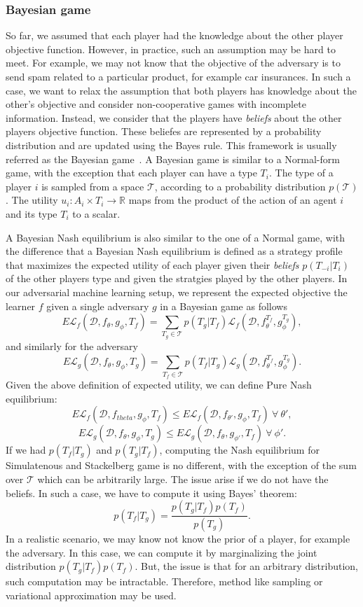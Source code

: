 \subsubsection{Bayesian game}
So far, we assumed that each player had the knowledge about the other player objective function.
However, in practice, such an assumption may be hard to meet.
For example, we may  not know that the objective of the adversary is to send spam related to a particular product, for example car insurances.
In such a case, we want to relax the assumption that both players has knowledge about the other's objective and consider non-cooperative games with incomplete information.
Instead, we consider that the players have \textit{beliefs} about the other players objective function. These beliefes are represented by a probability distribution and are updated using the Bayes rule.
This framework is usually referred as the Bayesian game~\cite{harsanyi_bayesian_games}. A Bayesian game is similar to a Normal-form game, with the exception that each player can have a type $T_i$.
The type of a player $i$ is sampled from a space $\mathcal{T}$, according to a probability distribution $p(\mathcal{T})$. The utility $u_i:A_i\times T_i\to\mathbb{R}$ maps from the product of the action of
an agent $i$ and its type $T_i$ to a scalar.

A Bayesian Nash equilibrium is also similar to the one of a Normal game, with the difference that a Bayesian Nash equilibrium is defined as a strategy profile that maximizes the expected utility of each player
given their \textit{beliefs} $p(T_{-i}|T_i)$ of the other players type and given the stratgies played by the other players. In our adversarial machine learning setup, we represent the expected objective the learner $f$
given a single adversary $g$ in a Bayesian game as follows
\[
     E\mathcal{L}_f(\mathcal{D}, f_\theta, g_\phi, T_f) = \sum_{T_g\in\mathcal{T}}p(T_g|T_f)\mathcal L_f(\mathcal{D}, f_{\theta}^{T_f}, g_{\phi}^{T_g}),
\]
and similarly for the adversary
\[
    E\mathcal{L}_g(\mathcal{D}, f_\theta, g_\phi, T_g) = \sum_{T_f\in\mathcal{T}}p(T_f|T_g)\mathcal L_g(\mathcal{D}, f_{\theta}^{T_f}, g_{\phi}^{T_g}).
\]
Given the above definition of expected utility, we can define Pure Nash equilibrium:
\[
    E\mathcal{L}_f(\mathcal{D}, f_{theta}, g_\phi, T_f) \leq E\mathcal{L}_f(\mathcal{D}, f_{\theta'}, g_{\phi}, T_f)~\forall~\theta',
\]
\[
    E\mathcal{L}_g(\mathcal{D}, f_\theta, g_\phi, T_g) \leq E\mathcal{L}_g(\mathcal{D}, f_\theta, g_{\phi'}, T_f)~\forall~\phi'.
\]
If we had $p(T_f|T_g)$ and $p(T_g|T_f)$, computing the Nash equilibrium for Simulatenous and Stackelberg game is no different, with the exception
of the sum over $\mathcal{T}$ which can be arbitrarily large. The issue arise if we do not have the beliefs. In such a case,
we have to compute it using Bayes' theorem:
\[
    p(T_f|T_g) = \dfrac{p(T_g|T_f)p(T_f)}{p(T_g)}.
\]
In a realistic scenario, we may know not know the prior of a player, for example the adversary. In this case, we can compute it
by marginalizing the joint distribution $p(T_g|T_f)p(T_f)$. But, the issue is that for an arbitrary distribution, such computation may be intractable.
Therefore, method like sampling or variational approximation may be used.
